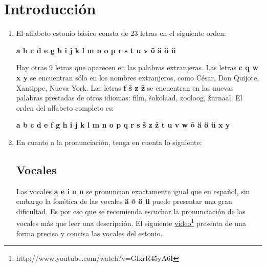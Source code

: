 

\chapter*{Introducción} %

\begin{enumerate}
	\item El alfabeto estonio básico consta de 23 letras en el siguiente orden:
	\begin{center}
	\begin{otherlanguage}{estonian}
		\textbf{a b c d e g h i j k l m n o p r s t u v õ ä ö ü}
	\end{otherlanguage}
	\end{center}

	Hay otras 9 letras que aparecen en las palabras extranjeras. Las letras \textbf{c q w x y} se encuentran sólo en los nombres extranjeros, como César, Don Quijote, Xantippe, Nueva York. Las letras \foreignlanguage{estonian}{\textbf{f š z ž}} se encuentran en las nuevas palabras prestadas de otros idiomas: \foreignlanguage{estonian}{film, šokolaad, zooloog, žurnaal}. El orden del alfabeto completo es:
	\begin{center}
	\begin{otherlanguage}{estonian}
		\textbf{a b c d e f g h i j k l m n o p q r s š z ž t u v w õ ä ö ü x y}
	\end{otherlanguage}
	\end{center}

	\item En cuanto a la pronunciación, tenga en cuenta lo siguiente:

	\section*{\Large{Vocales}}

	Las vocales \textbf{a e i o u} se pronuncian exactamente igual que en español, sin embargo la fonética de las vocales \foreignlanguage{estonian}{\textbf{ä õ ö ü}} puede presentar una gran dificultad. Es por eso que se recomienda escuchar la pronunciación de las vocales más que leer una descripción. El siguiente \href{http://www.youtube.com/watch?v=GfxrR45yA6I}{video}\footnote{http://www.youtube.com/watch?v=GfxrR45yA6I} presenta de una forma precisa y concisa las vocales del estonio.\\


\end{enumerate}
